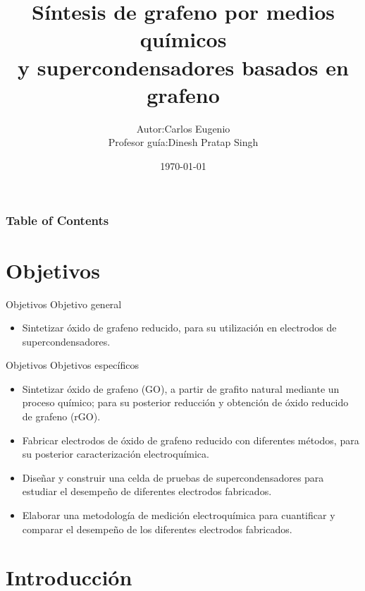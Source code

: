 \documentclass[aspectratio=169]{beamer}
\title{Síntesis de grafeno por medios químicos\\y supercondensadores basados en grafeno}
\date{\today}
\institute{Universidad de Santiago de Chile\\ Laboratorio de Nanosíntesis}
\begin{document}
	\author[Carlos Eugenio]{\begin{tabular}{r@{ }l} 
			Autor:      & Carlos Eugenio \\[1ex] 
			Profesor guía: & Dinesh Pratap Singh
	\end{tabular}}
	\maketitle
	\begin{frame}
		\frametitle{Table of Contents}
		\tableofcontents
	\end{frame}

	\section{Objetivos}
	\begin{frame}{Objetivos}
		Objetivo general
		\begin{itemize}
			\item Sintetizar óxido de grafeno reducido, para su utilización en electrodos de supercondensadores.
		\end{itemize}
	\end{frame}

	\begin{frame}{Objetivos}
		Objetivos específicos
		\begin{itemize}
			\item<+-> Sintetizar óxido de grafeno (GO), a partir de grafito natural mediante un proceso químico; para su posterior reducción y obtención de óxido reducido de grafeno (rGO).
			\item<+-> Fabricar electrodos de óxido de grafeno reducido con diferentes métodos, para su posterior caracterización electroquímica.
			\item<+-> Diseñar y construir una celda de pruebas de supercondensadores para estudiar el desempeño de diferentes electrodos fabricados.
			\item<+-> Elaborar una metodología de medición electroquímica para cuantificar y comparar el desempeño de los diferentes electrodos fabricados. 
		\end{itemize}
	\end{frame}

	\section{Introducción}
\end{document}
